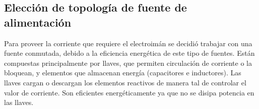 





\subsection{Elección de topología de fuente de alimentación}\label{sec_topologia-fuente-alimentacion}

%
%

Para proveer la corriente que requiere el electroimán se decidió trabajar con una fuente conmutada, debido a la eficiencia energética de este tipo de fuentes. Están compuestas principalmente por llaves, que permiten circulación de corriente o la bloquean, y elementos que almacenan energía (capacitores e inductores). Las llaves cargan o descargan los elementos reactivos de manera tal de controlar el valor de corriente. Son eficientes energéticamente ya que no se disipa potencia en las llaves.

